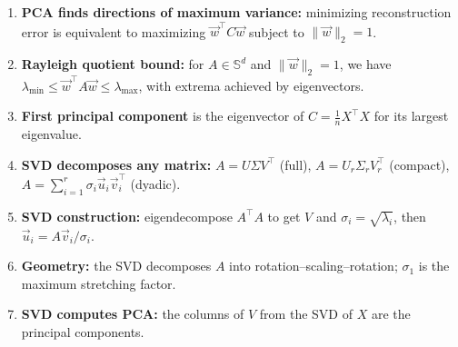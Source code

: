 \documentclass[10pt, twocolumn]{article}
\theoremstyle{definition}
\theoremstyle{plain}
\begin{document}
\begin{enumerate}
    \item \textbf{PCA finds directions of maximum variance:} minimizing reconstruction error is equivalent to maximizing $\vec{w}^\top C \vec{w}$ subject to $\|\vec{w}\|_2 = 1$.
    \item \textbf{Rayleigh quotient bound:} for $A \in \mathbb{S}^d$ and $\|\vec{w}\|_2 = 1$, we have $\lambda_{\min} \le \vec{w}^\top A \vec{w} \le \lambda_{\max}$, with extrema achieved by eigenvectors.
    \item \textbf{First principal component} is the eigenvector of $C = \frac{1}{n}X^\top X$ for its largest eigenvalue.
    \item \textbf{SVD decomposes any matrix:} $A = U\Sigma V^\top$ (full), $A = U_r \Sigma_r V_r^\top$ (compact), $A = \sum_{i=1}^{r} \sigma_i \vec{u}_i \vec{v}_i^\top$ (dyadic).
    \item \textbf{SVD construction:} eigendecompose $A^\top A$ to get $V$ and $\sigma_i = \sqrt{\lambda_i}$, then $\vec{u}_i = A\vec{v}_i / \sigma_i$.
    \item \textbf{Geometry:} the SVD decomposes $A$ into rotation--scaling--rotation; $\sigma_1$ is the maximum stretching factor.
    \item \textbf{SVD computes PCA:} the columns of $V$ from the SVD of $X$ are the principal components.
\end{enumerate}
\end{document}
